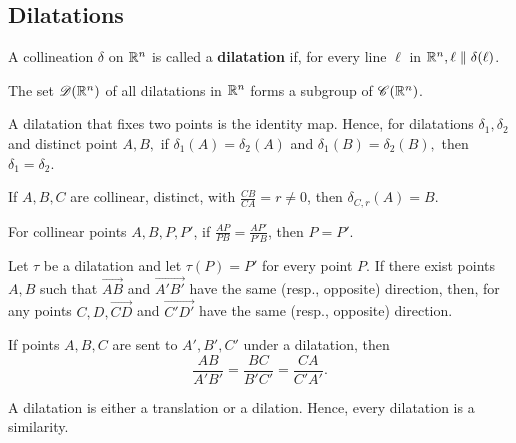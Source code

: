 \subsection{Dilatations}

\begin{definition}
    A collineation \(\delta\) on \(\mathbb{R}^n\) is called a \textbf{dilatation} if, for every line \(\ell\) in \(\mathbb{R}^n, \ell \parallel \delta(\ell)\).
\end{definition}

\begin{proposition}
    The set \(\mathscr{D}(\mathbb{R}^n)\) of all dilatations in \(\mathbb{R}^n\) forms a subgroup of \(\mathscr{C}(\mathbb{R}^n)\).
\end{proposition}

\begin{lemma}
    A dilatation that fixes two points is the identity map. Hence, for dilatations \(\delta_1, \delta_2\) and distinct point \(A, B, \) if \(\delta_1(A) = \delta_2(A)\) and \(\delta_1(B) = \delta_2(B), \) then \(\delta_1 = \delta_2\).
\end{lemma}

\begin{lemma}
    \begin{statements}{}
        \item If \(A, B, C\) are collinear, distinct, with \(\frac{CB}{CA} = r \neq 0\), then \(\delta_{C, r}(A) = B\).
        \item For collinear points \(A, B, P, P'\), if \(\frac{AP}{PB} = \frac{AP'}{P'B}\), then \(P = P'\).
        \item Let \(\tau\) be a dilatation and let \(\tau(P) = P'\) for every point \(P\). If there exist points \(A, B\) such that \(\overrightarrow{AB}\) and \(\overrightarrow{A'B'}\) have the same (resp., opposite) direction, then, for any points \(C, D, \overrightarrow{CD}\) and \(\overrightarrow{C'D'}\) have the same (resp., opposite) direction.
    \end{statements}
\end{lemma}

\begin{corollary}
    If points \(A, B, C\) are sent to \(A', B', C'\) under a dilatation, then
    \[\frac{AB}{A'B'} = \frac{BC}{B'C'} = \frac{CA}{C'A'}.\]
\end{corollary}

\begin{theorem}
    A dilatation is either a translation or a dilation. Hence, every dilatation is a similarity.
\end{theorem}